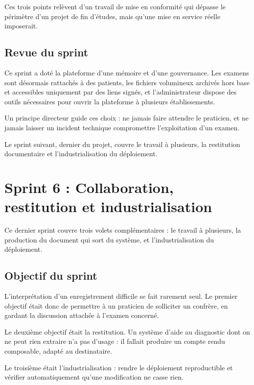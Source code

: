 Ces trois points relèvent d'un travail de mise en conformité qui dépasse le périmètre d'un
projet de fin d'études, mais qu'une mise en service réelle imposerait.

\subsection{Revue du sprint}

Ce sprint a doté la plateforme d'une mémoire et d'une gouvernance. Les examens sont désormais
rattachés à des patients, les fichiers volumineux archivés hors base et accessibles uniquement
par des liens signés, et l'administrateur dispose des outils nécessaires pour ouvrir la
plateforme à plusieurs établissements.

Un principe directeur guide ces choix : ne jamais faire attendre le
praticien, et ne jamais laisser un incident technique compromettre l'exploitation d'un examen.

Le sprint suivant, dernier du projet, couvre le travail à plusieurs, la restitution
documentaire et l'industrialisation du déploiement.

\section{Sprint 6 : Collaboration, restitution et industrialisation}
\label{sec:sprint6}

Ce dernier sprint couvre trois volets complémentaires : le travail à plusieurs, la
production du document qui sort du système, et l'industrialisation du déploiement.

\subsection{Objectif du sprint}

L'interprétation d'un enregistrement difficile se fait rarement seul. Le premier objectif
était donc de permettre à un praticien de solliciter un confrère, en gardant la
discussion attachée à l'examen concerné.

Le deuxième objectif était la restitution. Un système d'aide au diagnostic dont on ne
peut rien extraire n'a pas d'usage : il fallait produire un compte rendu composable, adapté au
destinataire.

Le troisième était l'industrialisation : rendre le déploiement reproductible et
vérifier automatiquement qu'une modification ne casse rien.

